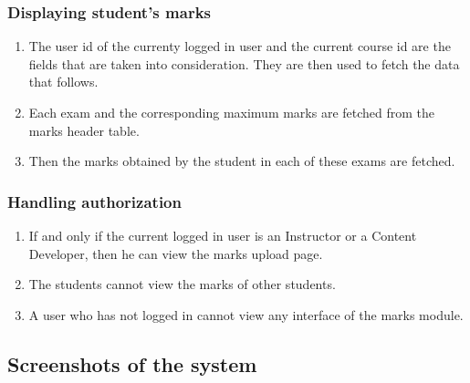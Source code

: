 \subsubsection{Displaying student's marks}
\begin{enumerate}
	\item The user id of the currenty logged in user and the current course id are the fields that are taken into consideration. They are then used to fetch the data that follows.
	\item Each exam and the corresponding maximum marks are fetched from the marks header table.
	\item Then the marks obtained by the student in each of these exams are fetched.
\end{enumerate}

\subsubsection{Handling authorization}
\begin{enumerate}
	\item If and only if the current logged in user is an Instructor or a Content Developer, then he can view the marks upload page.
	\item The students cannot view the marks of other students.
	\item A user who has not logged in cannot view any interface of the marks module.
\end{enumerate}

\newpage

\subsection{Screenshots of the system}

